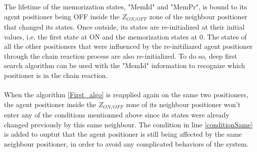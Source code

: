 \documentclass[]{spie}  %
\begin{document}
	 The lifetime of the memorization states, "MemId" and "MemPr", is bound to its agent positioner being OFF inside the $Z_{ON/OFF}$ zone of the neighbour positioner that changed its states. Once outside, its states are re-initialized at their initial values, i.e. the first state at ON and the memorization states at 0. The states of all the other positioners that were influenced by the re-initiliazed agent positioner through the chain reaction process are also re-initialized. To do so, deep first search algorithm can be used with the "MemId" information to recognize which positioner is in the chain reaction.\\\\
	When the algorithm \ref{First_algo} is reapplied again on the same two positioners, the agent positioner inside the $Z_{ON/OFF}$ zone of its neighbour positioner won't enter any of the conditions mentionned above since its states were already changed previously by this same neighbour. The condition in line \ref{conditionSame} is added to ouptut that the agent positioner is still being affected by the same neighbour positioner, in order to avoid any complicated behaviors of the system.  

	
\end{document}
